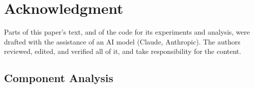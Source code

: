 \documentclass[conference]{IEEEtran}
\begin{document}
\section*{Acknowledgment}
Parts of this paper's text, and of the code for its experiments and analysis,
were drafted with the assistance of an AI model (Claude, Anthropic). The authors
reviewed, edited, and verified all of it, and take responsibility for the
content.




\appendix
\label{app:evaluation}

\subsection{Component Analysis}
\label{app:components}
\end{document}
